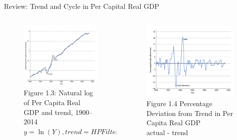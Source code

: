 \documentclass[11pt,aspectratio=43]{beamer}
\theoremstyle{definition}
\begin{document}
\begin{frame}{Review: Trend and Cycle in Per Capital Real GDP}
\label{slide:Review__Trend_and_Cycle_in_Per_Capital_Real_GDP}
\begin{columns}
    \begin{column}{0.5\textwidth}
        \begin{figure}
            \caption{Figure 1.3: Natural log of Per Capita Real GDP and trend, 1900–2014 \\ \alert{$y = \ln(Y), trend = HPFilter(y)$}}
            \includegraphics[width=\textwidth]{./figures/Figure1_3.jpg}
        \end{figure}
    \end{column}
    \begin{column}{0.5\textwidth}
        \begin{figure}
            \caption{Figure 1.4 Percentage Deviation from Trend in Per Capita Real GDP \\ \alert{actual - trend}}
            \includegraphics[width=\textwidth]{./figures/Figure1_4.jpg}

\end{figure}
\end{column}
\end{columns}
\end{frame}
\end{document}
